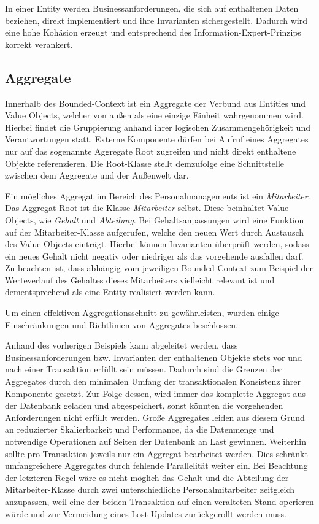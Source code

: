 In einer Entity werden Businessanforderungen, die sich auf enthaltenen Daten beziehen, direkt implementiert und ihre \Gls{Invariante}n sichergestellt. Dadurch wird eine hohe Kohäsion erzeugt und entsprechend des \Gls{Information-Expert-Prinzip}s korrekt verankert.

\subsection{Aggregate}

Innerhalb des Bounded-Context ist ein Aggregate der Verbund aus Entities und Value Objects, welcher von außen als eine einzige Einheit wahrgenommen wird. Hierbei findet die Gruppierung anhand ihrer logischen Zusammengehörigkeit und Verantwortungen statt. Externe Komponente dürfen bei Aufruf eines Aggregates nur auf das sogenannte Aggregate Root zugreifen und nicht direkt enthaltene Objekte referenzieren. Die Root-Klasse stellt demzufolge eine Schnittstelle zwischen dem Aggregate und der Außenwelt dar. 

Ein mögliches Aggregat im Bereich des Personalmanagements ist ein \emph{Mitarbeiter}. Das Aggregat Root ist die Klasse \emph{Mitarbeiter} selbst. Diese beinhaltet Value Objects, wie \emph{Gehalt} und \emph{Abteilung}. Bei Gehaltsanpassungen wird eine Funktion auf der Mitarbeiter-Klasse aufgerufen, welche den neuen Wert durch Austausch des Value Objects einträgt. Hierbei können Invarianten überprüft werden, sodass ein neues Gehalt nicht negativ oder niedriger als das vorgehende ausfallen darf. Zu beachten ist, dass abhängig vom jeweiligen Bounded-Context zum Beispiel der Werteverlauf des Gehaltes dieses Mitarbeiters vielleicht relevant ist und dementsprechend als eine Entity realisiert werden kann. 

Um einen effektiven Aggregationsschnitt zu gewährleisten, wurden einige Einschränkungen und Richtlinien von Aggregates beschlossen. 

Anhand des vorherigen Beispiels kann abgeleitet werden, dass Businessanforderungen bzw. Invarianten der enthaltenen Objekte stets vor und nach einer Transaktion erfüllt sein müssen. Dadurch sind die Grenzen der Aggregates durch den minimalen Umfang der transaktionalen Konsistenz ihrer Komponente gesetzt. Zur Folge dessen, wird immer das komplette Aggregat aus der Datenbank geladen und abgespeichert, sonst könnten die vorgehenden Anforderungen nicht erfüllt werden. Große Aggregates leiden aus diesem Grund an reduzierter Skalierbarkeit und Performance, da die Datenmenge und notwendige Operationen auf Seiten der Datenbank an Last gewinnen. Weiterhin sollte pro Transaktion jeweils nur ein Aggregat bearbeitet werden. Dies schränkt umfangreichere Aggregates durch fehlende Parallelität weiter ein. Bei Beachtung der letzteren Regel wäre es nicht möglich das Gehalt und die Abteilung der Mitarbeiter-Klasse durch zwei unterschiedliche Personalmitarbeiter zeitgleich anzupassen, weil eine der beiden Transaktion auf einen veralteten Stand operieren würde und zur Vermeidung eines \Gls{Lost Update}s zurückgerollt werden muss. 

